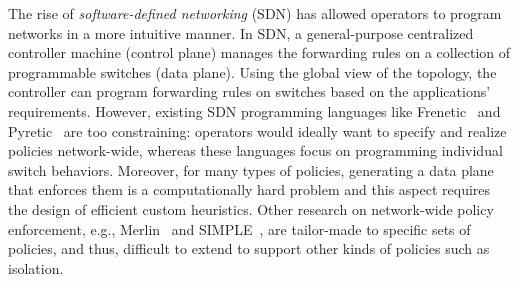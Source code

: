 
The rise of \emph{software-defined networking} (SDN) has allowed operators
to program networks in a more intuitive manner. In SDN, a general-purpose
centralized controller machine (control plane) manages the forwarding
rules on a collection of 
programmable switches (data plane). Using the global view of the 
topology, the controller can program forwarding rules on switches
based on the applications' requirements. 
However, existing
SDN programming languages like Frenetic~\cite{frenetic} and Pyretic~\cite{pyretic} are
too constraining: operators would ideally want to specify
and realize policies network-wide, whereas these languages focus on
programming individual switch behaviors.
Moreover, for many types of
  policies, generating a data plane 
  that enforces them is a
computationally hard problem and
this aspect requires the design of efficient custom heuristics.
Other research on network-wide policy enforcement, e.g.,
Merlin~\cite{merlin} and SIMPLE~\cite{simple}, are tailor-made to
specific sets of policies, and thus, difficult to extend to support
other kinds of policies such as isolation.



